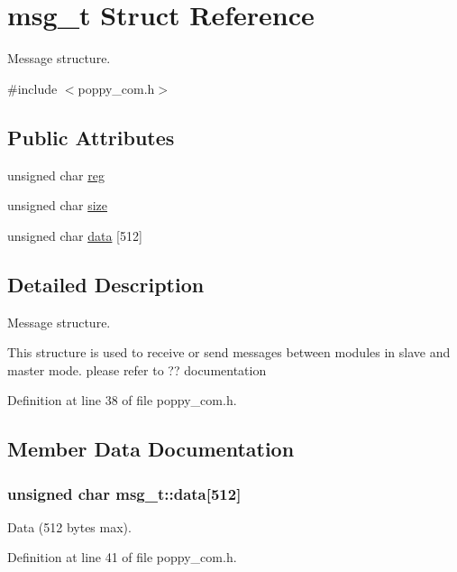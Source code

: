 \hypertarget{structmsg__t}{\section{msg\-\_\-t Struct Reference}
\label{structmsg__t}
}


Message structure.  




{\ttfamily \#include $<$poppy\-\_\-com.\-h$>$}

\subsection*{Public Attributes}
\begin{DoxyCompactItemize}
\item 
unsigned char \hyperlink{structmsg__t_a0aef01fbaf575c639d82d5beee92c421}{reg}
\item 
unsigned char \hyperlink{structmsg__t_a3736f2ca203e665223b225ca07def9b5}{size}
\item 
unsigned char \hyperlink{structmsg__t_ab11ea949abe5142d3e5c5911cf971860}{data} \mbox{[}512\mbox{]}
\end{DoxyCompactItemize}


\subsection{Detailed Description}
Message structure. 

This structure is used to receive or send messages between modules in slave and master mode. please refer to ?? documentation 

Definition at line 38 of file poppy\-\_\-com.\-h.



\subsection{Member Data Documentation}
\hypertarget{structmsg__t_ab11ea949abe5142d3e5c5911cf971860}{
\subsubsection[{data}]{\setlength{\rightskip}{0pt plus 5cm}unsigned char msg\-\_\-t\-::data\mbox{[}512\mbox{]}}}\label{structmsg__t_ab11ea949abe5142d3e5c5911cf971860}
Data (512 bytes max). 

Definition at line 41 of file poppy\-\_\-com.\-h.

